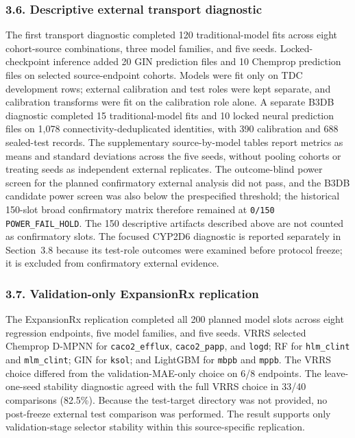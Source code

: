 \documentclass[
]{article}
\begin{document}
\subsubsection{3.6. Descriptive external transport
diagnostic}\label{descriptive-external-transport-diagnostic-1}

The first transport diagnostic completed 120 traditional-model fits across
eight cohort-source combinations, three model families, and five seeds.
Locked-checkpoint inference added 20 GIN prediction files and 10 Chemprop
prediction files on selected source-endpoint cohorts. Models were fit only on
TDC development rows; external calibration and test roles were kept separate,
and calibration transforms were fit on the calibration role alone. A separate
B3DB diagnostic completed 15 traditional-model fits and 10 locked neural
prediction files on 1,078 connectivity-deduplicated identities, with 390
calibration and 688 sealed-test records. The supplementary source-by-model
tables report metrics as means and standard deviations across the five seeds,
without pooling cohorts or treating seeds as independent external replicates.
The outcome-blind power screen for the planned confirmatory external analysis
did not pass, and the B3DB candidate power screen was also below the
prespecified threshold; the historical 150-slot broad confirmatory matrix
therefore remained at \texttt{0/150 POWER\_FAIL\_HOLD}. The 150 descriptive
artifacts described above are not counted as confirmatory slots. The focused
CYP2D6 diagnostic
is reported separately in Section~3.8 because its test-role outcomes were
examined before protocol freeze; it is excluded from confirmatory external
evidence.

\subsubsection{3.7. Validation-only ExpansionRx replication}\label{validation-only-expansionrx-results}

The ExpansionRx replication completed all 200 planned model slots across
eight regression endpoints, five model families, and five seeds. VRRS selected
Chemprop D-MPNN for \texttt{caco2\_efflux}, \texttt{caco2\_papp}, and
\texttt{logd}; RF for \texttt{hlm\_clint} and \texttt{mlm\_clint}; GIN for
\texttt{ksol}; and LightGBM for \texttt{mbpb} and \texttt{mppb}. The VRRS
choice differed from the validation-MAE-only choice on 6/8 endpoints. The
leave-one-seed stability diagnostic agreed with the full VRRS choice in 33/40
comparisons (82.5\%). Because the test-target directory was not provided, no
post-freeze external test comparison was performed. The result supports only
validation-stage selector stability within this source-specific replication.
\end{document}
